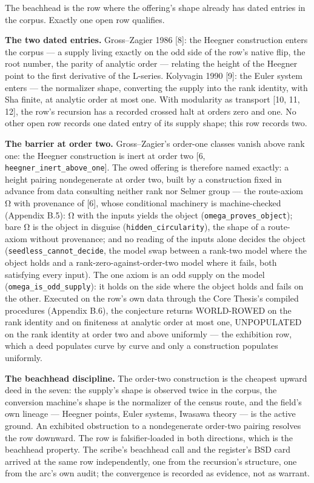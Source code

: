 \documentclass[10pt,twocolumn]{article}
\begin{document}
The beachhead is the row where the offering's shape already has dated
entries in the corpus. Exactly one open row qualifies.

\textbf{The two dated entries.} Gross--Zagier 1986 {[}8{]}: the Heegner
construction enters the corpus --- a supply living exactly on the odd
side of the row's native flip, the root number, the parity of analytic
order --- relating the height of the Heegner point to the first
derivative of the L-series. Kolyvagin 1990 {[}9{]}: the Euler system
enters --- the normalizer shape, converting the supply into the rank
identity, with Sha finite, at analytic order at most one. With
modularity as transport {[}10, 11, 12{]}, the row's recursion has a
recorded crossed halt at orders zero and one. No other open row records
one dated entry of its supply shape; this row records two.

\textbf{The barrier at order two.} Gross--Zagier's order-one classes
vanish above rank one: the Heegner construction is inert at order two
{[}6, \texttt{heegner\_inert\_above\_one}{]}. The owed offering is
therefore named exactly: a height pairing nondegenerate at order two,
built by a construction fixed in advance from data consulting neither
rank nor Selmer group --- the route-axiom Ω with provenance of {[}6{]},
whose conditional machinery is machine-checked (Appendix B.5): Ω with
the inputs yields the object (\texttt{omega\_proves\_object}); bare Ω is
the object in disguise (\texttt{hidden\_circularity}), the shape of a
route-axiom without provenance; and no reading of the inputs alone
decides the object (\texttt{seedless\_cannot\_decide}, the model swap
between a rank-two model where the object holds and a
rank-zero-against-order-two model where it fails, both satisfying every
input). The one axiom is an odd supply on the model
(\texttt{omega\_is\_odd\_supply}): it holds on the side where the object
holds and fails on the other. Executed on the row's own data through the
Core Thesis's compiled procedures (Appendix B.6), the conjecture returns
WORLD-ROWED on the rank identity and on finiteness at analytic order at
most one, UNPOPULATED on the rank identity at order two and above
uniformly --- the exhibition row, which a deed populates curve by curve
and only a construction populates uniformly.

\textbf{The beachhead discipline.} The order-two construction is the
cheapest upward deed in the seven: the supply's shape is observed twice
in the corpus, the conversion machine's shape is the normalizer of the
census route, and the field's own lineage --- Heegner points, Euler
systems, Iwasawa theory --- is the active ground. An exhibited
obstruction to a nondegenerate order-two pairing resolves the row
downward. The row is falsifier-loaded in both directions, which is the
beachhead property. The scribe's beachhead call and the register's BSD
card arrived at the same row independently, one from the recursion's
structure, one from the arc's own audit; the convergence is recorded as
evidence, not as warrant.
\end{document}
